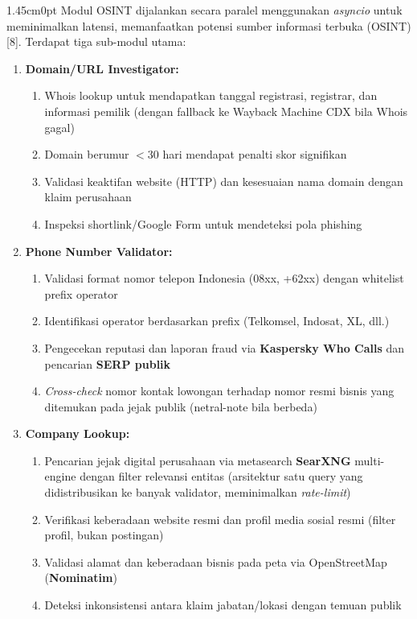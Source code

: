 \documentclass[12pt,a4paper]{article}
\begin{document}
\begin{adjustwidth}{1.45cm}{0pt}
\hspace*{0.85cm}Modul OSINT dijalankan secara paralel menggunakan \textit{asyncio} untuk meminimalkan latensi, memanfaatkan potensi sumber informasi terbuka (OSINT) [8].
Terdapat tiga sub-modul utama:

\begin{enumerate}[label=\textbf{\alph*.}, labelindent=0pt, leftmargin=*]
\item \textbf{Domain/URL Investigator:}
\begin{enumerate}[label=\textbf{\arabic*)}, leftmargin=0.50cm]
\item Whois lookup untuk mendapatkan tanggal registrasi, registrar, dan informasi pemilik (dengan fallback ke Wayback Machine CDX bila Whois gagal)
\item Domain berumur $< 30$ hari mendapat penalti skor signifikan
\item Validasi keaktifan website (HTTP) dan kesesuaian nama domain dengan klaim perusahaan
\item Inspeksi shortlink/Google Form untuk mendeteksi pola phishing
\end{enumerate}

\item \textbf{Phone Number Validator:}
\begin{enumerate}[label=\textbf{\arabic*)}, leftmargin=0.50cm]
\item Validasi format nomor telepon Indonesia (08xx, +62xx) dengan whitelist prefix operator
\item Identifikasi operator berdasarkan prefix (Telkomsel, Indosat, XL, dll.)
\item Pengecekan reputasi dan laporan fraud via \textbf{Kaspersky Who Calls} dan pencarian \textbf{SERP publik}
\item \textit{Cross-check} nomor kontak lowongan terhadap nomor resmi bisnis yang ditemukan pada jejak publik (netral-note bila berbeda)
\end{enumerate}

\item \textbf{Company Lookup:}
\begin{enumerate}[label=\textbf{\arabic*)}, leftmargin=0.50cm]
\item Pencarian jejak digital perusahaan via metasearch \textbf{SearXNG} multi-engine dengan filter relevansi entitas (arsitektur satu query yang didistribusikan ke banyak validator, meminimalkan \textit{rate-limit})
\item Verifikasi keberadaan website resmi dan profil media sosial resmi (filter profil, bukan postingan)
\item Validasi alamat dan keberadaan bisnis pada peta via OpenStreetMap (\textbf{Nominatim})
\item Deteksi inkonsistensi antara klaim jabatan/lokasi dengan temuan publik
\end{enumerate}
\end{enumerate}
\end{adjustwidth}
\end{document}
